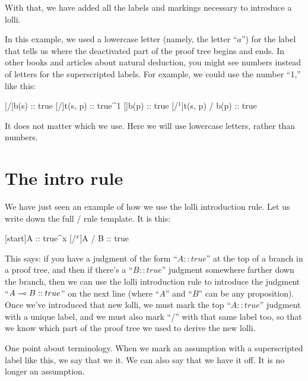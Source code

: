 \documentclass[../../../main.tex]{subfiles}
\begin{document}
\noindent
With that, we have added all the labels and markings necessary to introduce a lolli.

In this example, we used a lowercase letter (namely, the letter ``$a$'') for the label that tells us where the deactivated part of the proof tree begins and ends. In other books and articles about natural deduction, you might see numbers instead of letters for the superscripted labels. For example, we could use the number ``1,'' like this:

\begin{prooftree*}
  \hypo{}
  [\startrule/]{b(s) :: true}
  \hypo{}
  [\startrule/]{t(s, p) :: true^{1}}
  []{b(p) :: true}
  [\lolliIntro/$^{1}$]{t(s, p) \lolli/ b(p) :: true}
\end{prooftree*}

\noindent
It does not matter which we use. Here we will use lowercase letters, rather than numbers.



\section{The intro rule}

We have just seen an example of how we use the lolli introduction rule. Let us write down the full \lolliIntro/ rule template. It is this:

\begin{prooftree*}
  \hypo{}
  [start]{A :: true^{x}}
  \ellipsis{}{}
  [\lolliIntro/$^{x}$]{A \lolli/ B :: true}
\end{prooftree*}

\noindent
This says: if you have a judgment of the form ``$A :: true$'' at the top of a branch in a proof tree, and then if there's a ``$B :: true$'' judgment somewhere farther down the branch, then we can use the lolli introduction rule to introduce the judgment ``$A \lolli/ B :: true$'' on the next line (where ``$A$'' and ``$B$'' can be any proposition). Once we've introduced that new lolli, we must mark the top ``$A :: true$'' judgment with a unique label, and we must also mark ``\lolliIntro/'' with that same label too, so that we know which part of the proof tree we used to derive the new lolli.

One point about terminology. When we mark an assumption with a superscripted label like this, we say that we  it. We can also say that we have  it off. It is no longer an  assumption.
\end{document}
